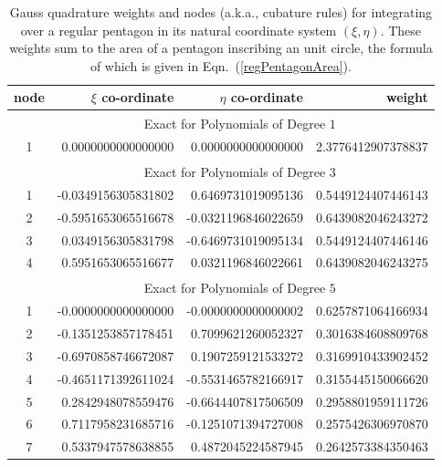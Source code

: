 \begin{table}
    \centering
    \begin{tabular}{|c|rrr|}
        \hline
        node & \centering $\xi$ co-ordinate \phantom{123}  & 
        $\eta$ co-ordinate \phantom{123} & weight \phantom{12345} \\ \hline
        & \multicolumn{3}{|c|}{Exact for Polynomials of Degree $1^{\phantom{|^|}}$} \\ \hline
        1 & 0.0000000000000000 & 0.0000000000000000 &
        2.3776412907378837\vphantom{$|^{|^|}$} \\ 
        \hline
        & \multicolumn{3}{|c|}{Exact for Polynomials of Degree $3^{\phantom{|^|}}$} \\ \hline
        1 & -0.0349156305831802 &  0.6469731019095136 &
        0.5449124407446143\vphantom{$|^{|^|}$} \\
        2 & -0.5951653065516678 & -0.0321196846022659 & 0.6439082046243272 \\
        3 &  0.0349156305831798 & -0.6469731019095134 & 0.5449124407446146 \\
        4 &  0.5951653065516677 &  0.0321196846022661 & 0.6439082046243275 \\ 
        \hline
        & \multicolumn{3}{|c|}{Exact for Polynomials of Degree $5^{\phantom{|^|}}$} \\ \hline
        1 & -0.0000000000000000 & -0.0000000000000002 &
        0.6257871064166934\vphantom{$|^{|^|}$} \\
        2 & -0.1351253857178451 &  0.7099621260052327 & 0.3016384608809768 \\
        3 & -0.6970858746672087 &  0.1907259121533272 & 0.3169910433902452 \\ 
        4 & -0.4651171392611024 & -0.5531465782166917 & 0.3155445150066620 \\
        5 &  0.2842948078559476 & -0.6644407817506509 & 0.2958801959111726 \\
        6 &  0.7117958231685716 & -0.1251071394727008 & 0.2575426306970870 \\
        7 &  0.5337947578638855 &  0.4872045224587945 & 0.2642573384350463 \\
        \hline
    \end{tabular}
    \caption{Gauss quadrature weights and nodes (a.k.a., cubature rules) for integrating over a regular pentagon in its natural coordinate system $( \xi , \eta )$.  These weights sum to the area of a pentagon inscribing an unit circle, the formula of which is given in Eqn.~(\ref{regPentagonArea}).}
    \label{tabQuadrature}
\end{table}

